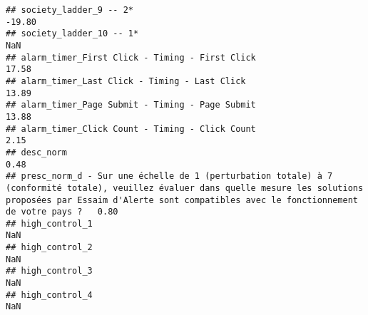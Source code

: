 \documentclass[
]{article}
\begin{document}
\begin{verbatim}
## society_ladder_9 -- 2*                                                                                                                                                                                                     -19.80
## society_ladder_10 -- 1*                                                                                                                                                                                                       NaN
## alarm_timer_First Click - Timing - First Click                                                                                                                                                                              17.58
## alarm_timer_Last Click - Timing - Last Click                                                                                                                                                                                13.89
## alarm_timer_Page Submit - Timing - Page Submit                                                                                                                                                                              13.88
## alarm_timer_Click Count - Timing - Click Count                                                                                                                                                                               2.15
## desc_norm                                                                                                                                                                                                                    0.48
## presc_norm_d - Sur une échelle de 1 (perturbation totale) à 7 (conformité totale), veuillez évaluer dans quelle mesure les solutions proposées par Essaim d'Alerte sont compatibles avec le fonctionnement de votre pays ?   0.80
## high_control_1                                                                                                                                                                                                                NaN
## high_control_2                                                                                                                                                                                                                NaN
## high_control_3                                                                                                                                                                                                                NaN
## high_control_4                                                                                                                                                                                                                NaN

\end{verbatim}
\end{document}
